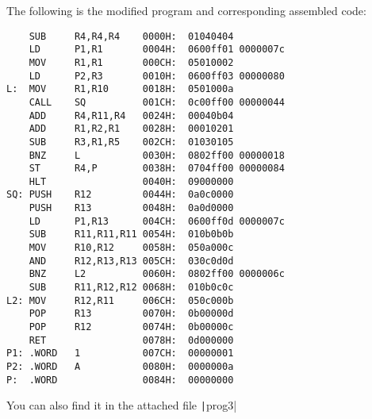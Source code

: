 \documentclass[answers]{exam}
\begin{document}
\begin{questions}
    \begin{solution}
        The following is the modified program and corresponding assembled code:
        \begin{verbatim}
    SUB     R4,R4,R4    0000H:  01040404
    LD      P1,R1       0004H:  0600ff01 0000007c
    MOV     R1,R1       000CH:  05010002
    LD      P2,R3       0010H:  0600ff03 00000080
L:  MOV     R1,R10      0018H:  0501000a
    CALL    SQ          001CH:  0c00ff00 00000044
    ADD     R4,R11,R4   0024H:  00040b04
    ADD     R1,R2,R1    0028H:  00010201
    SUB     R3,R1,R5    002CH:  01030105
    BNZ     L           0030H:  0802ff00 00000018
    ST      R4,P        0038H:  0704ff00 00000084
    HLT                 0040H:  09000000
SQ: PUSH    R12         0044H:  0a0c0000
    PUSH    R13         0048H:  0a0d0000
    LD      P1,R13      004CH:  0600ff0d 0000007c
    SUB     R11,R11,R11 0054H:  010b0b0b
    MOV     R10,R12     0058H:  050a000c
    AND     R12,R13,R13 005CH:  030c0d0d
    BNZ     L2          0060H:  0802ff00 0000006c
    SUB     R11,R12,R12 0068H:  010b0c0c
L2: MOV     R12,R11     006CH:  050c000b
    POP     R13         0070H:  0b00000d
    POP     R12         0074H:  0b00000c
    RET                 0078H:  0d000000
P1: .WORD   1           007CH:  00000001
P2: .WORD   A           0080H:  0000000a
P:  .WORD               0084H:  00000000
        \end{verbatim}
        You can also find it in the attached file \texttt|prog3|
    \end{solution}

\end{questions}
\end{document}
